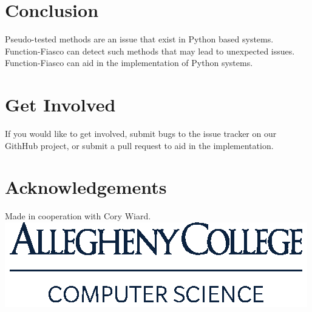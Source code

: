 \documentclass[a0paper,fleqn]{betterposter}
\begin{document}
{\section{Conclusion}
Pseudo-tested methods are an issue that exist in Python based systems. Function-Fiasco can detect such methods that may lead to unexpected issues. Function-Fiasco can aid in the implementation of Python systems.


\section{Get Involved}
If you would like to get involved, submit bugs to the issue tracker on our GithHub project, or submit a pull request to aid in the implementation.
\vfill

\section{Acknowledgements}
Made in cooperation with Cory Wiard.\\

\includegraphics[width=\textwidth]{img/ComputerScience-Stack}
}
\end{document}

